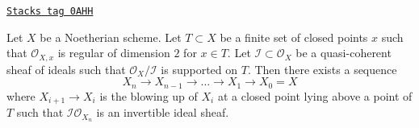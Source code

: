 \begin{lemma}
\label{resolve-lemma-make-ideal-principal}
\href{https://stacks.math.columbia.edu/tag/0AHH}{\texttt{Stacks tag 0AHH}}

Let $X$ be a Noetherian scheme. Let $T \subset X$ be a finite set of
closed points $x$ such that $\mathcal{O}_{X, x}$ is
regular of dimension $2$ for $x \in T$.
Let $\mathcal{I} \subset \mathcal{O}_X$ be a quasi-coherent
sheaf of ideals such that $\mathcal{O}_X/\mathcal{I}$ is supported
on $T$.
Then there exists a sequence
$$
X_n \to X_{n - 1} \to \ldots \to X_1 \to X_0 = X
$$
where $X_{i + 1} \to X_i$ is the blowing up of $X_i$ at a closed
point lying above a point of $T$ such that
$\mathcal{I}\mathcal{O}_{X_n}$ is an invertible ideal sheaf.
\end{lemma}

